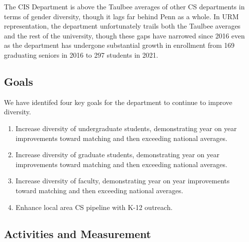 The CIS Department is above the Taulbee averages of other CS departments in terms of gender diversity, though it lags far behind Penn as a whole. In URM representation, the department unfortunately trails both the Taulbee averages and the rest of the university, though these gaps have narrowed since 2016 even as the department has undergone substantial growth in enrollment from 169 graduating seniors in 2016 to 297 students in 2021.

\subsection*{Goals}

We have identifed four key goals for the department to continue to
improve diversity.
\begin{enumerate}[itemsep=-1mm]
\item
Increase diversity of undergraduate students, demonstrating year on year improvements toward matching and then exceeding national averages.
\item
Increase diversity of graduate students, demonstrating year on year improvements toward matching and then exceeding national averages.
\item
Increase diversity of faculty, demonstrating year on year improvements toward matching and then exceeding national averages.
\item
Enhance local area CS pipeline with K-12 outreach.
\end{enumerate}

\subsection*{Activities and Measurement}








